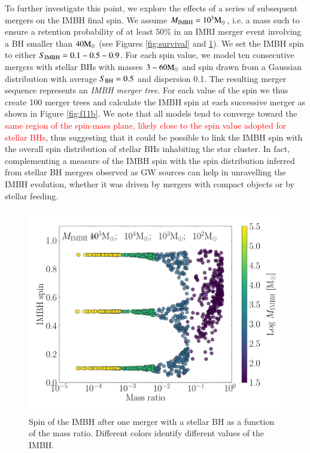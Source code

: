 \documentclass[article]{aa}
\newcommand{\Ms}{{\rm M}_\odot}
\newcommand{\ibh}{{\rm IMBH}}
\newcommand{\bh}{{\rm BH}}
\newcommand{\manuel}{\textcolor{red}}
\begin{document}
{To further investigate this point, we explore the effects of a series of subsequent mergers on the IMBH final spin. We assume $M_\ibh = 10^3\Ms$, i.e. a mass such to ensure a retention probability of at least $50\%$ in an IMRI merger event involving a BH smaller than $40\Ms$ (see Figures  \ref{fig:survival} and \ref{fig:f11a}). We set the IMBH spin to either $S_\ibh = 0.1-0.5-0.9$. For each spin value, we model ten consecutive mergers with stellar BHs with masses $3-60\Ms$ and spin drawn from a Gaussian distribution with average $S_\bh = 0.5$ and dispersion 0.1. The resulting merger sequence represents an {\it IMBH merger tree}. For each value of the spin we thus create 100 merger trees and calculate the IMBH spin at each successive merger as shown in Figure \ref{fig:f11b}.
We note that all models tend to converge toward the \manuel{same region  of the spin-mass plane, likely close to the spin value adopted for stellar BHs}, thus suggesting that it could be possible to link the IMBH spin with the overall spin distribution of stellar BHs inhabiting the star cluster. In fact, complementing a measure of the IMBH spin with the spin distribution inferred from stellar BH mergers observed as GW sources can help in unravelling the IMBH evolution, whether it was driven by mergers with compact objects or by stellar feeding.
}

\begin{figure}
\centering
\includegraphics[width=\columnwidth]{track}
\caption{Spin of the IMBH after one merger with a stellar BH as a function of the mass ratio. Different colors identify different values of the IMBH.}
\label{fig:f11a}
\end{figure}
\end{document}
